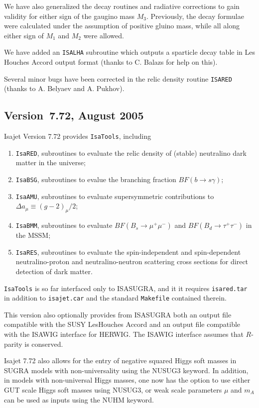 We have also generalized the decay routines and radiative corrections to
gain validity for either sign of the gaugino mass $M_3$. Previously, the
decay formulae were calculated under the assumption of positive gluino
mass, while all along either sign of $M_1$ and $M_2$ were allowed.

We have added an \verb|ISALHA| subroutine which outputs a sparticle
decay table in Les Houches Accord output format (thanks to C. Balazs for
help on this).

Several minor bugs have been corrected in the relic density routine
\verb|ISARED| (thanks to A. Belyaev and A. Pukhov).

\subsection{Version~7.72, August 2005}

Isajet Version 7.72 provides \verb|IsaTools|, including
\begin{enumerate}
\item \verb|IsaRED|, subroutines to evaluate the relic density of
(stable) neutralino dark matter in the universe;
\item \verb|IsaBSG|, subroutines to evalue the branching fraction
$BF(b\to s\gamma )$;
\item \verb|IsaAMU|, subroutines to evaluate supersymmetric
contributions to
$\Delta a_\mu\equiv (g-2)_\mu/2$;
\item \verb|IsaBMM|, subroutines to evaluate $BF(B_s\rightarrow
\mu^+\mu^-)$ and $BF(B_d\rightarrow \tau^+\tau^- )$ in the MSSM;
\item \verb|IsaRES|, subroutines to evaluate the spin-independent and
spin-dependent neutralino-proton and neutralino-neutron scattering cross
sections for direct detection of dark matter.
\end{enumerate}
\verb|IsaTools| is so far interfaced only to ISASUGRA, and it it
requires \verb|isared.tar| in addition to \verb|isajet.car| and the
standard \verb|Makefile| contained therein.

This version also optionally provides from ISASUGRA both an output file
compatible with the SUSY LesHouches Accord and an output file compatible
with the ISAWIG interface for HERWIG. The ISAWIG interface assumes that
$R$-parity is conserved.

Isajet 7.72 also allows for the entry of negative squared Higgs soft
masses in SUGRA models with non-universality using the NUSUG3 keyword.
In addition, in models with non-universal Higgs masses, one now has the
option to use either GUT scale Higgs soft masses using NUSUG3, or weak
scale parameters $\mu$ and $m_A$ can be used as inputs using the NUHM
keyword.

